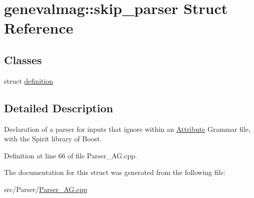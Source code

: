 \hypertarget{structgenevalmag_1_1skip__parser}{
\section{genevalmag::skip\_\-parser Struct Reference}
\label{structgenevalmag_1_1skip__parser}
}
\subsection*{Classes}
\begin{CompactItemize}
\item 
struct \hyperlink{structgenevalmag_1_1skip__parser_1_1definition}{definition}
\end{CompactItemize}


\subsection{Detailed Description}
Declaration of a parser for inputs that ignore within an \hyperlink{classgenevalmag_1_1Attribute}{Attribute} Grammar file, with the Spirit library of Boost. 

Definition at line 66 of file Parser\_\-AG.cpp.

The documentation for this struct was generated from the following file:\begin{CompactItemize}
\item 
src/Parser/\hyperlink{Parser__AG_8cpp}{Parser\_\-AG.cpp}\end{CompactItemize}
